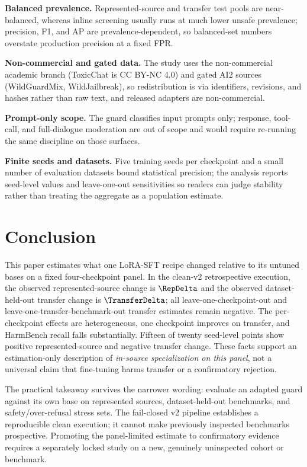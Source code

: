 \documentclass[11pt]{article}
\begin{document}
\textbf{Balanced prevalence.} Represented-source and transfer test pools are near-balanced, whereas inline screening usually runs at much lower unsafe prevalence; precision, F1, and AP are prevalence-dependent, so balanced-set numbers overstate production precision at a fixed FPR.

\textbf{Non-commercial and gated data.} The study uses the non-commercial academic branch (ToxicChat is CC BY-NC 4.0) and gated AI2 sources (WildGuardMix, WildJailbreak), so redistribution is via identifiers, revisions, and hashes rather than raw text, and released adapters are non-commercial.

\textbf{Prompt-only scope.} The guard classifies input prompts only; response, tool-call, and full-dialogue moderation are out of scope and would require re-running the same discipline on those surfaces.

\textbf{Finite seeds and datasets.} Five training seeds per checkpoint and a small number of evaluation datasets bound statistical precision; the analysis reports seed-level values and leave-one-out sensitivities so readers can judge stability rather than treating the aggregate as a population estimate.

\section{Conclusion}
\label{sec:conclusion}

This paper estimates what one LoRA-SFT recipe changed relative to its untuned bases on a fixed four-checkpoint panel. In the clean-v2 retrospective execution, the observed represented-source change is $\RepDelta$ and the observed dataset-held-out transfer change is $\TransferDelta$; all leave-one-checkpoint-out and leave-one-transfer-benchmark-out transfer estimates remain negative. The per-checkpoint effects are heterogeneous, one checkpoint improves on transfer, and HarmBench recall falls substantially. Fifteen of twenty seed-level points show positive represented-source and negative transfer change. These facts support an estimation-only description of \emph{in-source specialization on this panel}, not a universal claim that fine-tuning harms transfer or a confirmatory rejection.

The practical takeaway survives the narrower wording: evaluate an adapted guard against its own base on represented sources, dataset-held-out benchmarks, and safety/over-refusal stress sets. The fail-closed v2 pipeline establishes a reproducible clean execution; it cannot make previously inspected benchmarks prospective. Promoting the panel-limited estimate to confirmatory evidence requires a separately locked study on a new, genuinely uninspected cohort or benchmark.
\end{document}
